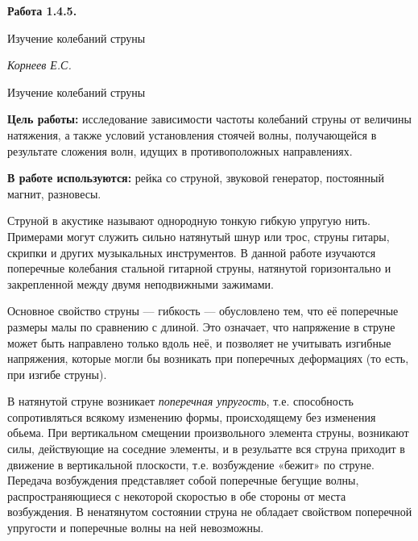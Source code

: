 \documentclass[14pt]{article}
\begin{document}
\begin{titlepage}
	\begin{center}
		\fontsize{18pt}{20pt}\selectfont
		\textbf{Работа 1.4.5.}	
	
		\vspace{5cm}
		\fontsize{24pt}{25pt}\selectfont
		Изучение колебаний струны
	\end{center}
	\begin{flushright}
		\fontsize{18pt}{20pt}\selectfont
		\vspace{14cm}
		\hspace{-3cm}
		\textit{Корнеев Е.С.}
	\end{flushright}		
\end{titlepage}

\begin{center}
	\fontsize{16pt}{18pt}\selectfont	
	Изучение колебаний струны
\end{center}

\fontsize{14pt}{16pt}\selectfont
\vspace{1cm}
\textbf{Цель работы:} исследование зависимости частоты колебаний струны от величины натяжения, а также условий установления стоячей волны, получающейся в результате сложения волн, идущих в противоположных направлениях.

\vspace{0.5cm}
\textbf{В работе используются:} рейка со струной, звуковой генератор, постоянный магнит, разновесы.

\vspace{1cm}
Струной в акустике называют однородную тонкую гибкую упругую нить. Примерами могут служить сильно натянутый шнур или трос, струны гитары, скрипки и других музыкальных инструментов. В данной работе изучаются поперечные колебания стальной гитарной струны, натянутой горизонтально и закрепленной между двумя неподвижными зажимами.

Основное свойство струны --- гибкость --- обусловлено тем, что её поперечные размеры малы по сравнению с длиной. Это означает, что напряжение в струне может быть направлено только вдоль неё, и позволяет не учитывать изгибные напряжения, которые могли бы возникать при поперечных деформациях (то есть, при изгибе струны).

В натянутой струне возникает \textsl{поперечная упругость}, т.е. способность сопротивляться всякому изменению формы, происходящему без изменения обьема. При вертикальном смещении произвольного элемента струны, возникают силы, действующие на соседние элементы, и в резульатте вся струна приходит в движение в вертикальной плоскости, т.е. возбуждение «бежит» по струне. Передача возбуждения представляет собой поперечные бегущие волны, распространяющиеся с некоторой скоростью в обе стороны от места возбуждения. В ненатянутом состоянии струна не обладает свойством поперечной упругости и поперечные волны на ней невозможны.
\end{document}
